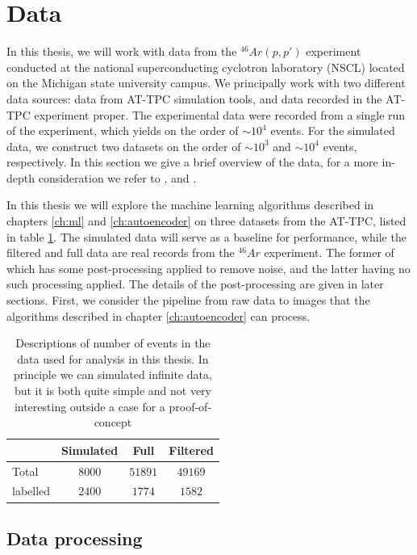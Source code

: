 \section{Data}\label{sec:data}

In this thesis, we will work with data from the ${}^{46}Ar(p, p')$ experiment conducted at the national superconducting cyclotron laboratory (NSCL) located on the Michigan state university campus. We principally work with two different data sources: data from AT-TPC simulation tools, and data recorded in the AT-TPC experiment proper. The experimental data were recorded from a single run of the experiment, which yields on the order of $\sim 10^4$ events.    For the simulated data, we construct two datasets on the order of $\sim10^3$ and $\sim10^4$ events, respectively. In this section we give a brief overview of the data, for a more in-depth consideration we refer to \cite{Mittig2015}, \cite{Suzuki2012} and  \cite{Bradt2017a}. 

In this thesis we will explore the machine learning algorithms described in chapters \ref{ch:ml} and \ref{ch:autoencoder} on three datasets from the AT-TPC, listed in table \ref{tab:datasets}. The simulated data will serve as a baseline for performance, while the filtered and full data are real records from the ${}^{46}Ar$ experiment. The former of which has some post-processing applied to remove noise, and the latter having no such processing applied. The details of the post-processing are given in later sections. First, we consider the pipeline from raw data to images that the algorithms described in chapter \ref{ch:autoencoder} can process. 

\begin{table}[H]
\centering
\caption{Descriptions of number of events in the data used for analysis in this thesis. In principle we can simulated infinite data, but it is both quite simple and not very interesting outside a case for a proof-of-concept}\label{tab:datasets}
\begin{tabular}{lccc}
\toprule
{} & Simulated & Full & Filtered \\
\midrule
Total &  $8000$ & $51891$ & $49169$ \\
labelled & $2400$ & $1774$ &  $1582$ \\ 
\bottomrule
\end{tabular}
\end{table}

\subsection{Data processing}

